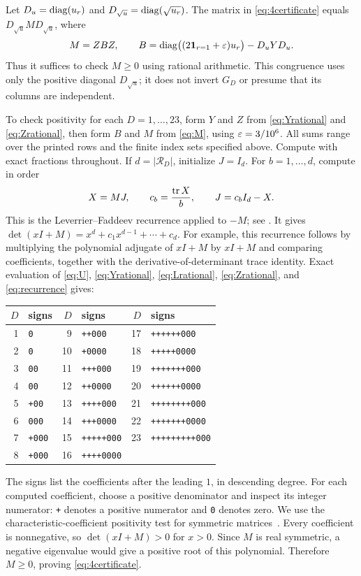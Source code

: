 Let $D_u=\operatorname{diag}(u_r)$ and $D_{\sqrt u}=\operatorname{diag}(\sqrt{u_r})$. The matrix in \eqref{eq:4certificate} equals $D_{\sqrt u}MD_{\sqrt u}$, where
\begin{equation}\label{eq:M}
 M=ZBZ,\qquad
 B=\operatorname{diag}\bigl((2\mathbf1_{r=1}+\varepsilon)u_r\bigr)-D_uYD_u.
\end{equation}
Thus it suffices to check $M\ge0$ using rational arithmetic. This
congruence uses only the positive diagonal $D_{\sqrt u}$; it does not
invert $G_D$ or presume that its columns are independent.

To check positivity for each $D=1,\ldots,23$, form $Y$ and $Z$ from
\eqref{eq:Yrational} and \eqref{eq:Zrational}, then form $B$ and $M$ from
\eqref{eq:M}, using $\varepsilon=3/10^6$. All sums range over the printed rows and
the finite index sets specified above. Compute with exact fractions
throughout. If $d=|\mathcal R_D|$, initialize $J=I_d$. For
$b=1,\ldots,d$, compute in order
\begin{equation}\label{eq:recurrence}
 X=MJ,\qquad c_b=\frac{\operatorname{tr} X}{b},\qquad J=c_bI_d-X.
\end{equation}
This is the Leverrier--Faddeev recurrence applied to $-M$;
see \cite{HouConference}. It gives
$\det(xI+M)=x^d+c_1x^{d-1}+\cdots+c_d$. For example, this recurrence follows by multiplying the polynomial adjugate of $xI+M$ by $xI+M$ and comparing coefficients, together with the derivative-of-determinant trace identity. Exact evaluation of \eqref{eq:U}, \eqref{eq:Yrational}, \eqref{eq:Lrational}, \eqref{eq:Zrational}, and \eqref{eq:recurrence} gives:
\begin{center}
\begin{tabular}{rl@{\qquad}rl@{\qquad}rl}
\toprule
$D$&signs&$D$&signs&$D$&signs\\
\midrule
1&\texttt{0}&9&\texttt{++000}&17&\texttt{++++++000}\\
2&\texttt{0}&10&\texttt{+0000}&18&\texttt{+++++0000}\\
3&\texttt{00}&11&\texttt{+++000}&19&\texttt{+++++++000}\\
4&\texttt{00}&12&\texttt{++0000}&20&\texttt{++++++0000}\\
5&\texttt{+00}&13&\texttt{++++000}&21&\texttt{++++++++000}\\
6&\texttt{000}&14&\texttt{+++0000}&22&\texttt{+++++++0000}\\
7&\texttt{+000}&15&\texttt{+++++000}&23&\texttt{+++++++++000}\\
8&\texttt{+000}&16&\texttt{++++0000}&&\\
\bottomrule
\end{tabular}
\end{center}
The signs list the coefficients after the leading $1$, in descending degree.
For each computed coefficient, choose a positive denominator and inspect
its integer numerator: \texttt{+} denotes a positive numerator and
\texttt{0} denotes zero. We use the characteristic-coefficient positivity test for symmetric
matrices~\cite[Theorem~5]{PeyrlParrilo}. Every coefficient is nonnegative,
so $\det(xI+M)>0$ for $x>0$. Since $M$ is real symmetric, a negative eigenvalue would give a positive root of this polynomial. Therefore $M\ge0$, proving \eqref{eq:4certificate}.

